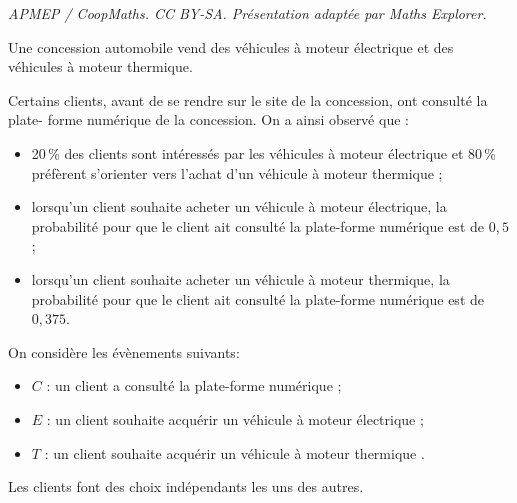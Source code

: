 \documentclass[10pt]{article}
\begin{document}
\noindent\textit{APMEP / CoopMaths. CC BY-SA. Présentation adaptée par Maths Explorer.}\par\medskip
\medskip

Une concession automobile vend des véhicules à moteur électrique et des véhicules à moteur thermique.

Certains clients, avant de se rendre sur le site de la concession, ont consulté la plate- forme numérique de la concession. On a ainsi observé que :
\begin{itemize}
\item[$\bullet$~~]20\,\% des clients sont intéressés par les véhicules à moteur électrique et 80\,\% préfèrent s'orienter vers l'achat d'un véhicule à moteur thermique ;
\item[$\bullet$~~]lorsqu'un client souhaite acheter un véhicule à moteur électrique, la probabilité pour que le client ait consulté la plate-forme numérique est de $0,5$ ;
\item[$\bullet$~~]lorsqu'un client souhaite acheter un véhicule à moteur thermique, la probabilité pour que le client ait consulté la plate-forme numérique est de $0,375$.
\end{itemize}

On considère les évènements suivants:


\begin{itemize}
\item[$\bullet$~~]$C$ : \og un client a consulté la plate-forme numérique \fg{} ;
\item[$\bullet$~~]$E$ : \og un client souhaite acquérir un véhicule à moteur électrique \fg{} ;
\item[$\bullet$~~]$T$ : \og un client souhaite acquérir un véhicule à moteur thermique \fg.
\end{itemize}

Les clients font des choix indépendants les uns des autres.

\medskip
\end{document}
